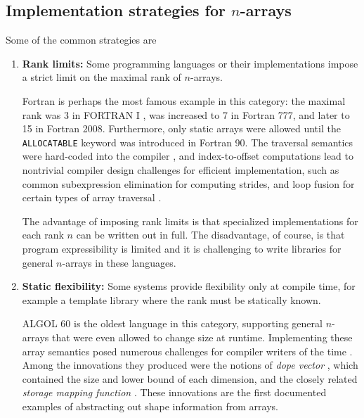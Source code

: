 \documentclass[preprint]{sigplanconf}
\newcommand{\ALGOL}{A\textsc{LGOL}}
\newcommand{\code}[1]{\texttt{#1}}
\begin{document}
\subsection{Implementation strategies for $n$-arrays}

Some of the common strategies are

\begin{enumerate}

\item {\bf Rank limits:} Some programming languages or their implementations
impose a strict limit on the maximal rank of $n$-arrays.

Fortran is perhaps the most famous example in this category: the maximal rank
was 3 in FORTRAN I \cite{Backus:1957fa}, was increased to 7 in Fortran 777,
and later to 15 in Fortran 2008. Furthermore, only static arrays were allowed
until the \code{ALLOCATABLE} keyword was introduced in Fortran 90. The
traversal semantics were hard-coded into the compiler \cite[pp.~10--
11]{Backus:1956pr}, and index-to-offset computations lead to nontrivial
compiler design challenges for efficient implementation, such as common
subexpression elimination for computing strides, and loop fusion for certain
types of array traversal \cite{Busam:1969oe}.



The advantage of imposing rank limits is that specialized implementations for
each rank $n$ can be written out in full. The disadvantage, of course, is that
program expressibility is limited and it is challenging to write libraries for
general $n$-arrays in these languages.

\item {\bf Static flexibility:} Some systems provide flexibility only at
compile time, for example a template library where the rank must be statically
known.

\ALGOL{} 60 is the oldest language in this category, supporting general
$n$-arrays that were even allowed to change size at runtime. Implementing
these array semantics posed numerous challenges for compiler writers of the
time \cite{Randell:1964a6}. Among the innovations they produced were the
notions of \textit{dope vector} \cite{Sattley:1960as, Sattley:1961as}, which
contained the size and lower bound of each dimension, and the closely related
\textit{storage mapping function} \cite[pp.~80--87]{Randell:1964a6}. These
innovations are the first documented examples of abstracting out shape
information from arrays.


\end{enumerate}
\end{document}
